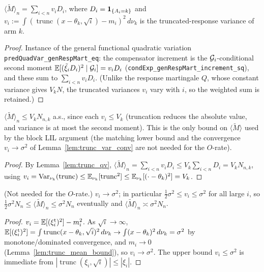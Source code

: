 \begin{lemma}\label{lem:trunc_qv}
\leanok
{}
$\langle\tilde M\rangle_n=\sum_{i<n}v_i D_i$, where $D_i=\mathbf{1}_{\{A_i=k\}}$ and
$v_i:=\int(\operatorname{trunc}(x-\theta_k,\sqrt i)-m_i)^2\,d\nu_k$ is the truncated-response
variance of arm $k$.
\end{lemma}
\begin{proof}\leanok
{}
Instance of the general functional quadratic variation
\texttt{predQuadVar\_genRespMart\_eq}: the compensator increment is the $\mathcal{G}_i$-conditional
second moment $\mathbb{E}[(\tilde\xi_i D_i)^2\mid\mathcal{G}_i]=v_i D_i$
(\texttt{condExp\_genRespMart\_increment\_sq}), and these sum to $\sum_{i<n}v_i D_i$. (Unlike the
response martingale $Q$, whose constant variance gives $V_k N$, the truncated variances $v_i$ vary
with $i$, so the weighted sum is retained.)
\end{proof}

\begin{lemma}\label{lem:trunc_qv_le}
\leanok
{}
$\langle\tilde M\rangle_n\le V_k N_{n,k}$ a.s., since each $v_i\le V_k$ (truncation reduces the
absolute value, and variance is at most the second moment). This is the only bound on
$\langle\tilde M\rangle$ used by the block LIL argument (the matching lower bound and the
convergence $v_i\to\sigma^2$ of Lemma~\ref{lem:trunc_var_conv} are not needed for the $O$-rate).
\end{lemma}
\begin{proof}\leanok
{}
By Lemma~\ref{lem:trunc_qv}, $\langle\tilde M\rangle_n=\sum_{i<n}v_i D_i\le V_k\sum_{i<n}D_i
=V_k N_{n,k}$, using $v_i=\operatorname{Var}_{\nu_k}(\operatorname{trunc})\le
\mathbb{E}_{\nu_k}[\operatorname{trunc}^2]\le\mathbb{E}_{\nu_k}[(\cdot-\theta_k)^2]=V_k$.
\end{proof}

\begin{lemma}\label{lem:trunc_var_conv}
(Not needed for the $O$-rate.) $v_i\to\sigma^2$; in particular $\tfrac12\sigma^2\le v_i\le\sigma^2$
for all large $i$, so
$\tfrac12\sigma^2 N_n\le\langle\tilde M\rangle_n\le\sigma^2 N_n$ eventually and
$\langle\tilde M\rangle_n\asymp\sigma^2 N_n$.
\end{lemma}
\begin{proof}
$v_i=\mathbb{E}[(\xi_i^{\mathrm t})^2]-m_i^2$. As $\sqrt i\to\infty$, $\mathbb{E}[(\xi_i^{\mathrm t})^2]
=\int\operatorname{trunc}(x-\theta_k,\sqrt i)^2\,d\nu_k\to\int(x-\theta_k)^2\,d\nu_k=\sigma^2$
by monotone/dominated convergence, and $m_i\to0$ (Lemma~\ref{lem:trunc_mean_bound}), so
$v_i\to\sigma^2$. The upper bound $v_i\le\sigma^2$ is immediate from
$|\operatorname{trunc}(\xi_i,\sqrt i)|\le|\xi_i|$.
\end{proof}

